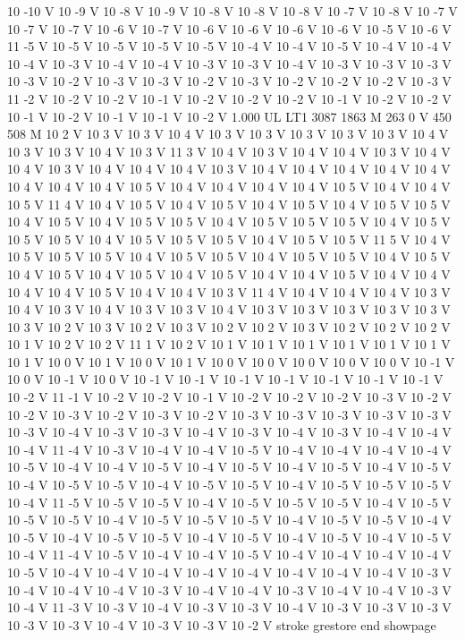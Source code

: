 {{10 -10 V
10 -9 V
10 -8 V
10 -9 V
10 -8 V
10 -8 V
10 -8 V
10 -7 V
10 -8 V
10 -7 V
10 -7 V
10 -7 V
10 -6 V
10 -7 V
10 -6 V
10 -6 V
10 -6 V
10 -6 V
10 -5 V
10 -6 V
11 -5 V
10 -5 V
10 -5 V
10 -5 V
10 -5 V
10 -4 V
10 -4 V
10 -5 V
10 -4 V
10 -4 V
10 -4 V
10 -3 V
10 -4 V
10 -4 V
10 -3 V
10 -3 V
10 -4 V
10 -3 V
10 -3 V
10 -3 V
10 -3 V
10 -2 V
10 -3 V
10 -3 V
10 -2 V
10 -3 V
10 -2 V
10 -2 V
10 -2 V
10 -3 V
11 -2 V
10 -2 V
10 -2 V
10 -1 V
10 -2 V
10 -2 V
10 -2 V
10 -1 V
10 -2 V
10 -2 V
10 -1 V
10 -2 V
10 -1 V
10 -1 V
10 -2 V
1.000 UL
LT1
3087 1863 M
263 0 V
450 508 M
10 2 V
10 3 V
10 3 V
10 4 V
10 3 V
10 3 V
10 3 V
10 3 V
10 3 V
10 4 V
10 3 V
10 3 V
10 4 V
10 3 V
11 3 V
10 4 V
10 3 V
10 4 V
10 4 V
10 3 V
10 4 V
10 4 V
10 3 V
10 4 V
10 4 V
10 4 V
10 3 V
10 4 V
10 4 V
10 4 V
10 4 V
10 4 V
10 4 V
10 4 V
10 4 V
10 5 V
10 4 V
10 4 V
10 4 V
10 4 V
10 5 V
10 4 V
10 4 V
10 5 V
11 4 V
10 4 V
10 5 V
10 4 V
10 5 V
10 4 V
10 5 V
10 4 V
10 5 V
10 5 V
10 4 V
10 5 V
10 4 V
10 5 V
10 5 V
10 4 V
10 5 V
10 5 V
10 5 V
10 4 V
10 5 V
10 5 V
10 5 V
10 4 V
10 5 V
10 5 V
10 5 V
10 4 V
10 5 V
10 5 V
11 5 V
10 4 V
10 5 V
10 5 V
10 5 V
10 4 V
10 5 V
10 5 V
10 4 V
10 5 V
10 5 V
10 4 V
10 5 V
10 4 V
10 5 V
10 4 V
10 5 V
10 4 V
10 5 V
10 4 V
10 4 V
10 5 V
10 4 V
10 4 V
10 4 V
10 4 V
10 5 V
10 4 V
10 4 V
10 3 V
11 4 V
10 4 V
10 4 V
10 4 V
10 3 V
10 4 V
10 3 V
10 4 V
10 3 V
10 3 V
10 4 V
10 3 V
10 3 V
10 3 V
10 3 V
10 3 V
10 3 V
10 2 V
10 3 V
10 2 V
10 3 V
10 2 V
10 2 V
10 3 V
10 2 V
10 2 V
10 2 V
10 1 V
10 2 V
10 2 V
11 1 V
10 2 V
10 1 V
10 1 V
10 1 V
10 1 V
10 1 V
10 1 V
10 1 V
10 0 V
10 1 V
10 0 V
10 1 V
10 0 V
10 0 V
10 0 V
10 0 V
10 0 V
10 -1 V
10 0 V
10 -1 V
10 0 V
10 -1 V
10 -1 V
10 -1 V
10 -1 V
10 -1 V
10 -1 V
10 -1 V
10 -2 V
11 -1 V
10 -2 V
10 -2 V
10 -1 V
10 -2 V
10 -2 V
10 -2 V
10 -3 V
10 -2 V
10 -2 V
10 -3 V
10 -2 V
10 -3 V
10 -2 V
10 -3 V
10 -3 V
10 -3 V
10 -3 V
10 -3 V
10 -3 V
10 -4 V
10 -3 V
10 -3 V
10 -4 V
10 -3 V
10 -4 V
10 -3 V
10 -4 V
10 -4 V
10 -4 V
11 -4 V
10 -3 V
10 -4 V
10 -4 V
10 -5 V
10 -4 V
10 -4 V
10 -4 V
10 -4 V
10 -5 V
10 -4 V
10 -4 V
10 -5 V
10 -4 V
10 -5 V
10 -4 V
10 -5 V
10 -4 V
10 -5 V
10 -4 V
10 -5 V
10 -5 V
10 -4 V
10 -5 V
10 -5 V
10 -4 V
10 -5 V
10 -5 V
10 -5 V
10 -4 V
11 -5 V
10 -5 V
10 -5 V
10 -4 V
10 -5 V
10 -5 V
10 -5 V
10 -4 V
10 -5 V
10 -5 V
10 -5 V
10 -4 V
10 -5 V
10 -5 V
10 -5 V
10 -4 V
10 -5 V
10 -5 V
10 -4 V
10 -5 V
10 -4 V
10 -5 V
10 -5 V
10 -4 V
10 -5 V
10 -4 V
10 -5 V
10 -4 V
10 -5 V
10 -4 V
11 -4 V
10 -5 V
10 -4 V
10 -4 V
10 -5 V
10 -4 V
10 -4 V
10 -4 V
10 -4 V
10 -5 V
10 -4 V
10 -4 V
10 -4 V
10 -4 V
10 -4 V
10 -4 V
10 -4 V
10 -4 V
10 -3 V
10 -4 V
10 -4 V
10 -4 V
10 -3 V
10 -4 V
10 -4 V
10 -3 V
10 -4 V
10 -4 V
10 -3 V
10 -4 V
11 -3 V
10 -3 V
10 -4 V
10 -3 V
10 -3 V
10 -4 V
10 -3 V
10 -3 V
10 -3 V
10 -3 V
10 -3 V
10 -4 V
10 -3 V
10 -3 V
10 -2 V
stroke
grestore
end
showpage
}}%
